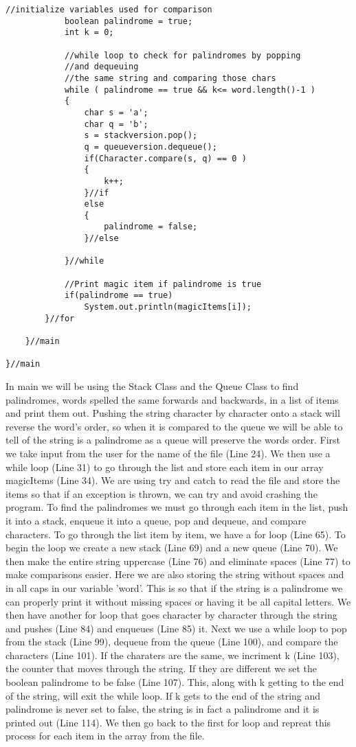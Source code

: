 \documentclass{article}
\begin{document}
\begin{lstlisting}[frame = single,
backgroundcolor = \color{grey!12}]
			//initialize variables used for comparison 
			boolean palindrome = true;
			int k = 0;
			
			//while loop to check for palindromes by popping 
			//and dequeuing 
			//the same string and comparing those chars
			while ( palindrome == true && k<= word.length()-1 )
			{
				char s = 'a';
				char q = 'b';
				s = stackversion.pop();
				q = queueversion.dequeue();
				if(Character.compare(s, q) == 0 ) 
				{
					k++;
				}//if		
				else
				{
					palindrome = false;
				}//else
					
			}//while
			
			//Print magic item if palindrome is true
			if(palindrome == true)
				System.out.println(magicItems[i]);
		}//for
		
	}//main

}//main
\end{lstlisting}
\large

In main we will be using the Stack Class and the Queue Class to find palindromes, words spelled the same forwards and backwards, in a list of items and print them out. Pushing the string character by character onto a stack will reverse the word's order, so when it is compared to the queue we will be able to tell of the string is a palindrome as a queue will preserve the words order. First we take input from the user for the name of the file (Line 24). We then use a while loop (Line 31) to go through the list and store each item in our array magicItems (Line 34). We are using try and catch to read the file and store the items so that if an exception is thrown, we can try and avoid crashing the program. To find the palindromes we must go through each item in the list, push it into a stack, enqueue it into a queue, pop and dequeue, and compare characters. To go through the list item by item, we have a for loop (Line 65). To begin the loop we create a new stack (Line 69) and a new queue (Line 70). We then make the entire string uppercase (Line 76) and eliminate spaces (Line 77) to make comparisons easier. Here we are also storing the string without spaces and in all caps in our variable 'word'. This is so that if the string is a palindrome we can properly print it without missing spaces or having it  be all capital letters. We then have another for loop that goes character by character through the string and pushes (Line 84) and enqueues (Line 85) it. Next we use a while loop to pop from the stack (Line 99), dequeue from the queue (Line 100), and compare the characters (Line 101). If the charaters are the same, we incriment k (Line 103), the counter that moves through the string. If they are different we set the boolean palindrome to be false (Line 107). This, along with k getting to the end of the string, will exit the while loop. If k gets to the end of the string and palindrome is never set to false, the string is in fact a palindrome and it is printed out (Line 114). We then go back to the first for loop and repreat this process for each item in the array from the file. 
\end{document}
